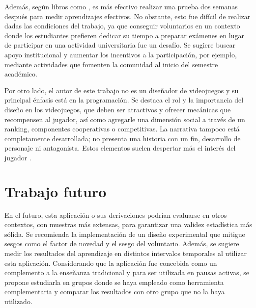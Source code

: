Además, según libros como \cite{Rogers2002InteractionDB}, es más efectivo realizar una prueba dos semanas después para medir aprendizajes efectivos. No obstante, esto fue difícil de realizar dadas las condiciones del trabajo, ya que conseguir voluntarios en un contexto donde los estudiantes prefieren dedicar su tiempo a preparar exámenes en lugar de participar en una actividad universitaria fue un desafío. Se sugiere buscar apoyo institucional y aumentar los incentivos a la participación, por ejemplo, mediante actividades que fomenten la comunidad al inicio del semestre académico.

Por otro lado, el autor de este trabajo no es un diseñador de videojuegos y su principal énfasis está en la programación. Se destaca el rol y la importancia del diseño en los videojuegos, que deben ser atractivos y ofrecer mecánicas que recompensen al jugador, así como agregarle una dimensión social a través de un ranking, componentes cooperativas o competitivas. La narrativa tampoco está completamente desarrollada; no presenta una historia con un fin, desarrollo de personaje ni antagonista. Estos elementos suelen despertar más el interés del jugador \cite{Zea2014ModelingST, FrangoSilveira2019BuildingEN}.


\section{Trabajo futuro}



En el futuro, esta aplicación o sus derivaciones podrían evaluarse en otros contextos, con muestras más extensas, para garantizar una validez estadística más sólida. Se recomienda la implementación de un diseño experimental que mitigue sesgos como el factor de novedad y el sesgo del voluntario. Además, se sugiere medir los resultados del aprendizaje en distintos intervalos temporales al utilizar esta aplicación. Considerando que la aplicación fue concebida como un complemento a la enseñanza tradicional y para ser utilizada en pausas activas, se propone estudiarla en grupos donde se haya empleado como herramienta complementaria y comparar los resultados con otro grupo que no la haya utilizado.

